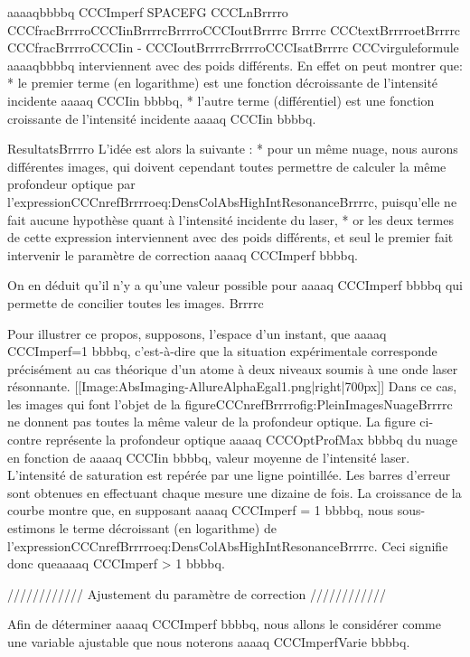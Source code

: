 aaaaqbbbbq
CCCImperf  SPACEFG  CCCLnBrrrro	CCCfracBrrrroCCCIinBrrrrcBrrrroCCCIoutBrrrrc	Brrrrc
CCCtextBrrrroetBrrrrc
CCCfracBrrrroCCCIin - CCCIoutBrrrrcBrrrroCCCIsatBrrrrc
CCCvirguleformule
aaaaqbbbbq 
 interviennent avec des poids différents. En effet on peut montrer que:
	* le premier terme (en logarithme) est une fonction décroissante		 de l'intensité incidente aaaaq CCCIin bbbbq,
	* l'autre terme (différentiel) est une fonction croissante de l'intensité incidente aaaaq CCCIin bbbbq.





ResultatsBrrrro
L'idée est alors la suivante : 
	* pour un même nuage, nous aurons différentes images, qui doivent cependant toutes permettre de calculer la même profondeur optique par l'expressionCCCnrefBrrrroeq:DensColAbsHighIntResonanceBrrrrc, puisqu'elle ne fait aucune hypothèse quant à l'intensité incidente du laser,
	* or les deux termes de cette expression interviennent avec des poids différents, et seul le premier fait intervenir le paramètre de correction aaaaq CCCImperf bbbbq.

On en déduit qu'il n'y a qu'une valeur possible pour aaaaq CCCImperf bbbbq qui permette de concilier toutes les images.
Brrrrc



Pour illustrer ce propos, supposons, l'espace d'un instant, que aaaaq CCCImperf=1 bbbbq, c'est-à-dire que la situation expérimentale corresponde précisément au cas théorique d'un atome à deux niveaux soumis à une onde laser résonnante. 
[[Image:AbsImaging-AllureAlphaEgal1.png|right|700px]]
Dans ce cas, les images qui font l'objet de la figureCCCnrefBrrrrofig:PleinImagesNuageBrrrrc ne donnent pas toutes la même valeur de la profondeur optique. La figure ci-contre représente la profondeur optique aaaaq CCCOptProfMax bbbbq du nuage 
en fonction de aaaaq CCCIin bbbbq, valeur moyenne de l'intensité laser. L'intensité de saturation est repérée par une ligne pointillée. Les barres d'erreur sont obtenues en effectuant chaque mesure une dizaine de fois.
La croissance de la courbe montre que, en supposant aaaaq CCCImperf = 1 bbbbq, nous sous-estimons le terme décroissant (en logarithme) de l'expressionCCCnrefBrrrroeq:DensColAbsHighIntResonanceBrrrrc. Ceci signifie donc queaaaaq CCCImperf > 1 bbbbq.


//////////// Ajustement du paramètre de correction ////////////

Afin de déterminer aaaaq CCCImperf bbbbq, nous allons le considérer comme une variable ajustable que nous noterons aaaaq CCCImperfVarie bbbbq.  

